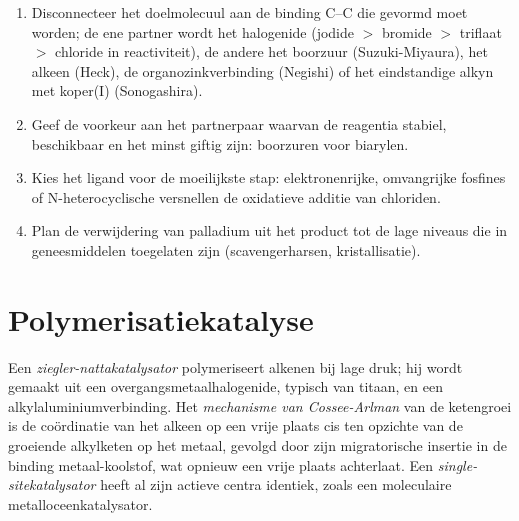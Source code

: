 \begin{method}\label{met:b3:homogeneous-catalysis:choose-coupling}
\begin{enumerate}
  \item Disconnecteer het doelmolecuul aan de binding C--C die gevormd moet
        worden; de ene partner wordt het
        halogenide (jodide $>$ bromide $>$ triflaat $>$ chloride in reactiviteit), de andere het
        boorzuur (Suzuki-Miyaura), het alkeen (Heck), de organozinkverbinding
        (Negishi) of het eindstandige alkyn met koper(I) (Sonogashira).
  \item Geef de voorkeur aan het partnerpaar waarvan de reagentia stabiel,
        beschikbaar en het minst giftig zijn: boorzuren voor biarylen.
  \item Kies het ligand voor de moeilijkste stap: elektronenrijke,
        omvangrijke fosfines of N-heterocyclische  versnellen de
        oxidatieve additie van chloriden.
  \item Plan de verwijdering van palladium uit het product tot de lage
        niveaus die in geneesmiddelen toegelaten zijn (scavengerharsen,
        kristallisatie).
\end{enumerate}
\end{method}

\section{Polymerisatiekatalyse}

\begin{definition}\label{def:b3:homogeneous-catalysis:ziegler-natta}
Een \emph{ziegler-nattakatalysator}
polymeriseert alkenen bij lage druk; hij wordt gemaakt uit een
overgangsmetaalhalogenide, typisch van titaan, en een
alkylaluminiumverbinding. Het
\emph{mechanisme van Cossee-Arlman}
van de ketengroei is de coördinatie van het alkeen op een vrije plaats
cis ten opzichte van de groeiende alkylketen op het metaal, gevolgd door
zijn migratorische insertie in de binding metaal-koolstof, wat opnieuw
een vrije plaats achterlaat. Een
\emph{single-sitekatalysator} heeft al zijn
actieve centra identiek, zoals een moleculaire metalloceenkatalysator.
\end{definition}

